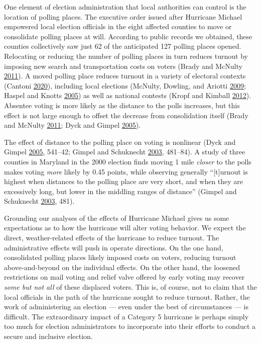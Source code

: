 \documentclass[
  12pt,
]{article}
\begin{document}
One element of election administration that local authorities can control is the location of polling places. The executive order issued after Hurricane Michael empowered local election officials in the eight affected counties to move or consolidate polling places at will. According to public records we obtained, these counties collectively saw just 62 of the anticipated 127 polling places opened. Relocating or reducing the number of polling places in turn reduces turnout by imposing new search and transportation costs on voters (Brady and McNulty \protect\hyperlink{ref-Brady2011}{2011}). A moved polling place reduces turnout in a variety of electoral contexts (Cantoni \protect\hyperlink{ref-Cantoni2020}{2020}), including local elections (McNulty, Dowling, and Ariotti \protect\hyperlink{ref-McNulty2009}{2009}; Haspel and Knotts \protect\hyperlink{ref-Haspel2005}{2005}) as well as national contests (Kropf and Kimball \protect\hyperlink{ref-Kropf2012}{2012}). Absentee voting is more likely as the distance to the polls increases, but this effect is not large enough to offset the decrease from consolidation itself (Brady and McNulty \protect\hyperlink{ref-Brady2011}{2011}; Dyck and Gimpel \protect\hyperlink{ref-Dyck2005}{2005}).

The effect of distance to the polling place on voting is nonlinear (Dyck and Gimpel \protect\hyperlink{ref-Dyck2005}{2005}, 541--42; Gimpel and Schuknecht \protect\hyperlink{ref-Gimpel2003}{2003}, 481--84). A study of three counties in Maryland in the 2000 election finds moving 1 mile \emph{closer} to the polls makes voting \emph{more} likely by 0.45 points, while observing generally ``{[}t{]}urnout is highest when distances to the polling place are very short, and when they are excessively long, but lower in the middling ranges of distance'' (Gimpel and Schuknecht \protect\hyperlink{ref-Gimpel2003}{2003}, 481).

Grounding our analyses of the effects of Hurricane Michael gives us some expectations as to how the hurricane will alter voting behavior. We expect the direct, weather-related effects of the hurricane to reduce turnout. The administrative effects will push in operate directions. On the one hand, consolidated polling places likely imposed costs on voters, reducing turnout above-and-beyond on the individual effects. On the other hand, the loosened restrictions on mail voting and relief valve offered by early voting may recover \emph{some but not all} of these displaced voters. This is, of course, not to claim that the local officials in the path of the hurricane sought to reduce turnout. Rather, the work of administering an election --- even under the best of circumstances --- is difficult. The extraordinary impact of a Category 5 hurricane is perhaps simply too much for election administrators to incorporate into their efforts to conduct a secure and inclusive election.
\end{document}
